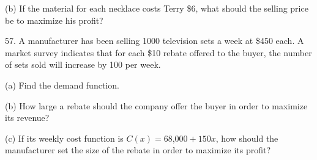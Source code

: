 \documentclass{sebase}
\begin{document}
\begin{multicols}{2}
\begin{ExerciseList}
\begin{ExerciseList}
%

\item[(b)] If the material for each necklace costs Terry \$6, what should
the selling price be to maximize his profit?

%
\end{ExerciseList}

\item[\hfill 57.] A manufacturer has been selling 1000 television sets a
week at \$450 each. A market survey indicates that for each \$10 rebate
offered to the buyer, the number of sets sold will increase by 100 per week.

\begin{ExerciseList}
\item[(a)] Find the demand function.

%

%

\item[(b)] How large a rebate should the company offer the buyer in order to
maximize its revenue?

%

%

\item[(c)] If its weekly cost function is $C(x)=68$,$000+150x$, how should
the manufacturer set the size of the rebate in order to maximize its profit?

%


\end{ExerciseList}
\end{ExerciseList}
\end{multicols}
\end{document}
